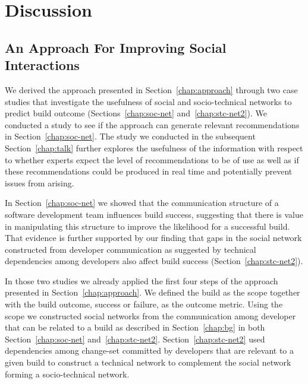 \section{Discussion}
\label{chap:disc}
\subsection{An Approach For Improving Social Interactions}
\label{ch:dis:app}
We derived the approach presented in Section~\ref{chap:approach} through two case studies that investigate the usefulness of social and socio-technical networks to predict build outcome (Sections~\ref{chap:soc-net} and~\ref{chap:stc-net2}).
We conducted a study to see if the approach can generate relevant recommendations in Section~\ref{chap:soc-net}.
The study we conducted in the subsequent Section~\ref{chap:talk} further explores the usefulness of the information with respect to whether experts expect the level of recommendations to be of use as well as if these recommendations could be produced in real time and potentially prevent issues from arising.
%

In Section~\ref{chap:soc-net} we showed that the communication structure of a software development team influences build success, suggesting that there is value in manipulating this structure to improve the likelihood for a successful build.
That evidence is further supported by our finding that gaps in the social network constructed from developer communication as suggested by technical dependencies among developers also affect build success (Section~\ref{chap:stc-net2}).

In those two studies we already applied the first four steps of the approach presented in Section~\ref{chap:approach}.
We defined the build as the scope together with the build outcome, success or failure, as the outcome metric.
Using the scope we constructed social networks from the communication among developer that can be related to a build as described in Section~\ref{chap:bg} in both Section~\ref{chap:soc-net} and~\ref{chap:stc-net2}.
Section~\ref{chap:stc-net2} used dependencies among change-set committed by developers that are relevant to a given build to construct a technical network to complement the social network forming a socio-technical network.

